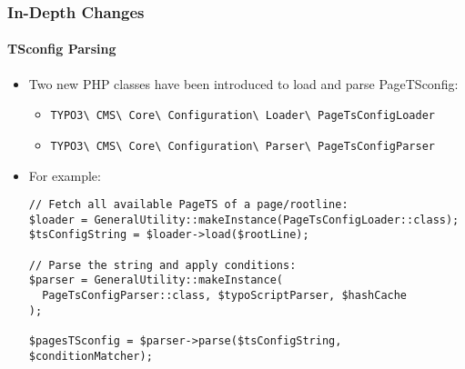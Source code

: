 
\begin{frame}[fragile]
	\frametitle{In-Depth Changes}
	\framesubtitle{TSconfig Parsing}

	\lstset{basicstyle=\tiny\ttfamily}

	\begin{itemize}
		\item Two new PHP classes have been introduced to load and parse PageTSconfig:
			\begin{itemize}\smaller
				\item \texttt{TYPO3\textbackslash
					CMS\textbackslash
					Core\textbackslash
					Configuration\textbackslash
					Loader\textbackslash
					PageTsConfigLoader}
				\item \texttt{TYPO3\textbackslash
					CMS\textbackslash
					Core\textbackslash
					Configuration\textbackslash
					Parser\textbackslash
					PageTsConfigParser}
			\end{itemize}

		\item For example:
\begin{lstlisting}
// Fetch all available PageTS of a page/rootline:
$loader = GeneralUtility::makeInstance(PageTsConfigLoader::class);
$tsConfigString = $loader->load($rootLine);

// Parse the string and apply conditions:
$parser = GeneralUtility::makeInstance(
  PageTsConfigParser::class, $typoScriptParser, $hashCache
);

$pagesTSconfig = $parser->parse($tsConfigString, $conditionMatcher);
\end{lstlisting}

	\end{itemize}

\end{frame}



